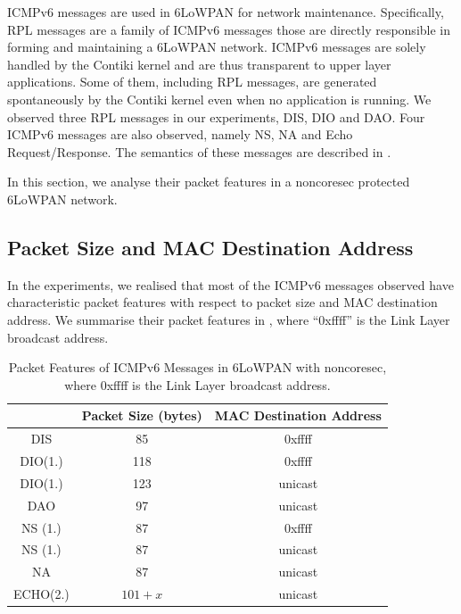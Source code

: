 ICMPv6 messages are used in 6LoWPAN for network maintenance. Specifically, RPL messages are a family of ICMPv6 messages those are directly responsible in forming and maintaining a 6LoWPAN network. ICMPv6 messages are solely handled by the Contiki kernel and are thus transparent to upper layer applications. Some of them, including RPL messages, are generated spontaneously by the Contiki kernel even when no application is running. We observed three RPL messages in our experiments, DIS, DIO and DAO. Four ICMPv6 messages are also observed, namely NS, NA and Echo Request/Response. The semantics of these messages are described in .

In this section, we analyse their packet features in a noncoresec protected 6LoWPAN network.

\subsection{Packet Size and MAC Destination Address} \label{Size and Dst of ICMP}

In the experiments, we realised that most of the ICMPv6 messages observed have characteristic packet features with respect to packet size and MAC destination address. We summarise their packet features in , where ``0xffff'' is the Link Layer broadcast address.

\begin{table}[ht!]
	\center
	\begin{tabular}{|c|c|c|}
		\hline
		       & Packet Size (bytes) & MAC Destination Address \\ \hline
		DIS    & 85                  & 0xffff                       \\ \hline
		DIO(1.) & 118                 & 0xffff                       \\ \hline
		DIO(1.) & 123                 & unicast                      \\ \hline
		DAO    & 97                  & unicast                      \\ \hline
		NS (1.) & 87                  & 0xffff                       \\ \hline
		NS (1.) & 87                  & unicast                      \\ \hline
		NA     & 87                  & unicast                      \\ \hline
		ECHO(2.)   & $101+x$               & unicast                      \\ \hline
	\end{tabular}
	\caption{Packet Features of ICMPv6 Messages in 6LoWPAN with noncoresec, where 0xffff is the Link Layer broadcast address.}
	\label{Tbl: Packet Features of ICMPv6 Messages in 6LoWPAN with noncoresec}
\end{table}


